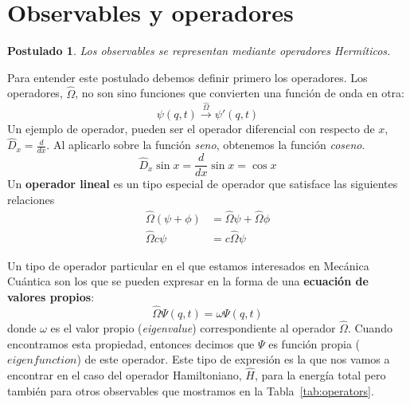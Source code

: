 \documentclass{tufte-handout}
\newtheorem{theorem}{Postulado}
\begin{document}
\section{Observables y operadores}
\begin{theorem}
Los observables se representan mediante operadores 
Hermíticos.
\end{theorem}
Para entender este postulado debemos definir primero
los operadores. Los operadores, $\hat{\Omega}$, no son
sino funciones que convierten una función de onda 
en otra:
\begin{equation}
    \psi(q,t)\xrightarrow{\hat{\Omega}}\psi'(q,t)
\end{equation}
Un ejemplo de operador, pueden ser el operador
diferencial con respecto de $x$, $\hat{D}_x=\frac{d}{dx}$.
Al aplicarlo sobre la función \textit{seno}, obtenemos
la función \textit{coseno}.
\begin{equation}
    \hat{D}_x\sin x=\frac{d}{dx}\sin x =\cos x
\end{equation}
Un \textbf{operador lineal} es un tipo especial de operador
que satisface las siguientes relaciones
\begin{equation}
      \begin{array}{rl}
        \hat{\Omega}(\psi+\phi) &=\hat{\Omega}\psi + \hat{\Omega}\phi\\
        \hat{\Omega}c\psi &=c\hat{\Omega}\psi
    \end{array}
\end{equation}

Un tipo de operador particular en el que estamos 
interesados en Mecánica Cuántica son los que se pueden
expresar en la forma de una \textbf{ecuación de valores
propios}:
\begin{equation}
    \hat{\Omega}\Psi(q,t)=\omega\Psi(q,t)
\end{equation}
donde $\omega$ es el valor propio (\textit{eigenvalue})
correspondiente al operador $\hat{\Omega}$. Cuando
encontramos esta propiedad, entonces decimos que $\Psi$ 
es función propia ($\textit{eigenfunction}$) de este
operador. Este tipo de expresión es la que nos vamos a
encontrar en el caso del operador Hamiltoniano, 
$\hat{H}$, para la energía total pero también para 
otros observables que mostramos en la 
Tabla~\ref{tab:operators}.
\end{document}
